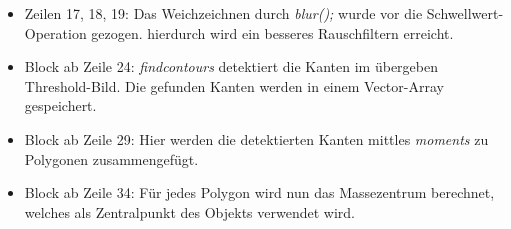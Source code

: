 	\begin{itemize}
	\item Zeilen 17, 18, 19: Das Weichzeichnen durch \textit{blur();} wurde vor die Schwellwert-Operation gezogen. hierdurch wird ein besseres Rauschfiltern erreicht.
	\item Block ab Zeile 24: \textit{findcontours} detektiert die Kanten im übergeben Threshold-Bild. Die gefunden Kanten werden in einem Vector-Array gespeichert.
	\item Block ab Zeile 29: Hier werden die detektierten Kanten mittles \textit{moments} zu Polygonen zusammengefügt.
	\item Block ab Zeile 34: Für jedes Polygon wird nun das Massezentrum berechnet, welches als Zentralpunkt des Objekts verwendet wird.
	\end{itemize}
	\cite{cv-findcontours}